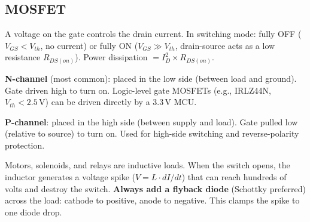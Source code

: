 \documentclass[11pt,letterpaper,twoside,openany]{book}
\begin{document}
\subsection{MOSFET}
A voltage on the gate controls the drain current. In switching mode: fully OFF ($V_{GS} < V_{th}$, no current) or fully ON ($V_{GS} \gg V_{th}$, drain-source acts as a low resistance $R_{DS(on)}$). Power dissipation $= I_D^2 \times R_{DS(on)}$.

\textbf{N-channel} (most common): placed in the low side (between load and ground). Gate driven high to turn on. Logic-level gate MOSFETs (e.g., IRLZ44N, $V_{th} < 2.5$\,V) can be driven directly by a 3.3\,V MCU.

\textbf{P-channel}: placed in the high side (between supply and load). Gate pulled low (relative to source) to turn on. Used for high-side switching and reverse-polarity protection.

\begin{warningbox}
Motors, solenoids, and relays are inductive loads. When the switch opens, the inductor generates a voltage spike ($V = L \cdot dI/dt$) that can reach hundreds of volts and destroy the switch. \textbf{Always add a flyback diode} (Schottky preferred) across the load: cathode to positive, anode to negative. This clamps the spike to one diode drop.
\end{warningbox}
\end{document}
